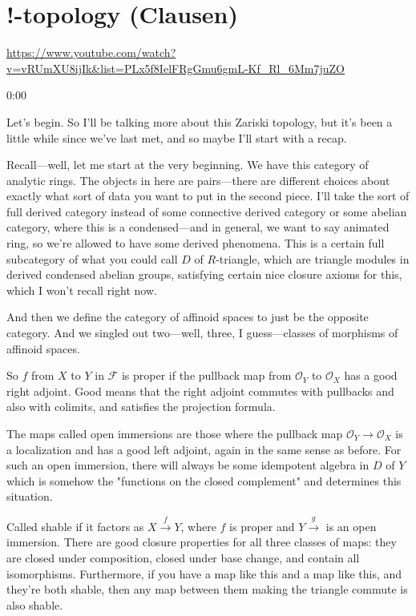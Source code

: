 
\section{\ufs !-topology (Clausen)}

\url{https://www.youtube.com/watch?v=vRUmXU8ijIk&list=PLx5f8IelFRgGmu6gmL-Kf_Rl_6Mm7juZO}
\renewcommand{\yt}[2]{\href{https://www.youtube.com/watch?v=vRUmXU8ijIk&list=PLx5f8IelFRgGmu6gmL-Kf_Rl_6Mm7juZO&t=#1}{#2}}
\vspace{1em}

\begin{unfinished}{0:00}

Let's begin. So I'll be talking more about this Zariski topology, but it's been a little while since we've last met, and so maybe I'll start with a recap.

Recall---well, let me start at the very beginning. We have this category of analytic rings. The objects in here are pairs---there are different choices about exactly what sort of data you want to put in the second piece. I'll take the sort of full derived category instead of some connective derived category or some abelian category, where this is a condensed---and in general, we want to say animated ring, so we're allowed to have some derived phenomena. This is a certain full subcategory of what you could call $D$ of $R$-triangle, which are triangle modules in derived condensed abelian groups, satisfying certain nice closure axioms for this, which I won't recall right now.

And then we define the category of affinoid spaces to just be the opposite category. And we singled out two---well, three, I guess---classes of morphisms of affinoid spaces. 

So $f$ from $X$ to $Y$ in $\mathcal{F}$ is proper if the pullback map from $\mathcal{O}_Y$ to $\mathcal{O}_X$ has a good right adjoint. Good means that the right adjoint commutes with pullbacks and also with colimits, and satisfies the projection formula. 

The maps called open immersions are those where the pullback map $\mathcal{O}_Y \to \mathcal{O}_X$ is a localization and has a good left adjoint, again in the same sense as before. For such an open immersion, there will always be some idempotent algebra in $D$ of $Y$ which is somehow the "functions on the closed complement" and determines this situation.

Called shable if it factors as $X \xrightarrow{f} Y$, where $f$ is proper and $Y \xrightarrow{g}$ is an open immersion. There are good closure properties for all three classes of maps: they are closed under composition, closed under base change, and contain all isomorphisms. Furthermore, if you have a map like this and a map like this, and they're both shable, then any map between them making the triangle commute is also shable.


\end{unfinished}
